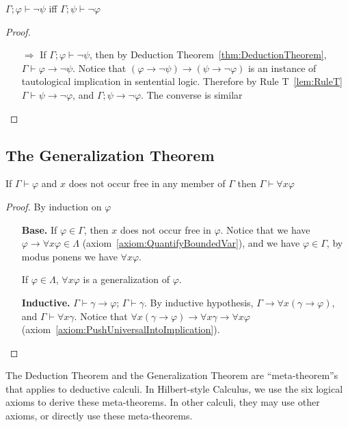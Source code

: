 \begin{theorem}[Contraposition]
    $\Gamma;\varphi\vdash\neg\psi$ iff $\Gamma;\psi\vdash\neg\varphi$
\end{theorem}
\begin{proof}
    \begin{itemize}
        \item[$\Rightarrow$] If $\Gamma;\varphi\vdash\neg\psi$, then by Deduction Theorem~\ref{thm:DeductionTheorem}, $\Gamma\vdash\varphi\to\neg\psi$. Notice that $\left( \varphi\to\neg\psi \right) \to \left( \psi\to\neg\varphi \right)$ is an instance of tautological implication in sentential logic. Therefore by Rule T~\ref{lem:RuleT} $\Gamma\vdash\psi\to\neg\varphi$, and $\Gamma;\psi\to\neg\varphi$. The converse is similar
    \end{itemize}
\end{proof}

\subsection{The Generalization Theorem}

\begin{theorem}
    \label{thm:GeneralizationTheorem}
    If $\Gamma\vdash\varphi$ and $x$ does not occur free in any member of $\Gamma$ then $\Gamma\vdash\forall x \varphi$
\end{theorem}
\begin{proof}
    By induction on $\varphi$
    \begin{itemize}
        \item[] \textbf{Base.} If $\varphi\in\Gamma$, then $x$ does not occur free in $\varphi$. Notice that we have $\varphi\to\forall x \varphi \in \Lambda$ (axiom~\ref{axiom:QuantifyBoundedVar}), and we have $\varphi\in\Gamma$, by modus ponens we have $\forall x \varphi$.
        
        If $\varphi\in\Lambda$, $\forall x\varphi$ is a generalization of $\varphi$.
        \item[] \textbf{Inductive.} $\Gamma\vdash\gamma\to\varphi$; $\Gamma\vdash\gamma$. By inductive hypothesis, $\Gamma\to\forall x(\gamma\to\varphi)$, and $\Gamma\vdash\forall x \gamma$. Notice that $\forall x(\gamma\to\varphi) \to \forall x \gamma\to\forall x\varphi$ (axiom~\ref{axiom:PushUniversalIntoImplication}).
    \end{itemize}
\end{proof}

The Deduction Theorem and the Generalization Theorem are ``meta-theorem''s that applies to deductive calculi. In Hilbert-style Calculus, we use the six logical axioms to derive these meta-theorems. In other calculi, they may use other axioms, or directly use these meta-theorems.

